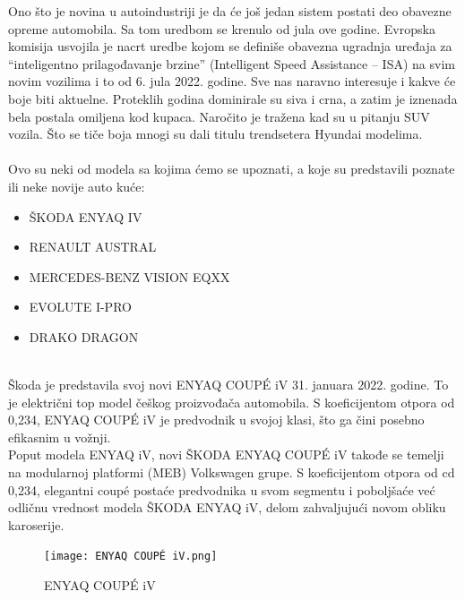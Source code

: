 \documentclass[a4paper]{article}
\begin{document}
    Ono što je novina u autoindustriji je da će još jedan sistem postati deo obavezne opreme automobila. Sa tom uredbom se krenulo od jula ove godine. Evropska komisija usvojila je nacrt uredbe kojom se definiše obavezna ugradnja uređaja za “inteligentno prilagođavanje brzine” (Intelligent Speed Assistance – ISA) na svim novim vozilima i to od 6. jula 2022. godine. Sve nas naravno interesuje i kakve će boje biti aktuelne. Proteklih godina dominirale su siva i crna, a zatim je iznenada bela postala omiljena kod kupaca. Naročito je tražena kad su u pitanju SUV vozila. Što se tiče boja mnogi su dali titulu  trendsetera Hyundai modelima.
    \\\\
    Ovo su neki od modela sa kojima ćemo se upoznati, a koje su predstavili poznate ili neke novije auto kuće:\\
    \begin{itemize}
     \item ŠKODA ENYAQ IV 
     \item RENAULT AUSTRAL   
     \item MERCEDES-BENZ VISION EQXX 
     \item EVOLUTE I-PRO 
     \item DRAKO DRAGON\\ 
    \end{itemize}
    
\\

    Škoda je predstavila svoj novi ENYAQ COUPÉ iV 31. januara 2022. godine. To je električni top model češkog proizvođača automobila. S koeficijentom otpora od 0,234, ENYAQ COUPÉ iV je predvodnik u svojoj klasi, što ga čini posebno efikasnim u vožnji. \\
    Poput modela ENYAQ iV, novi ŠKODA ENYAQ COUPÉ iV takođe se temelji na modularnoj platformi (MEB) Volkswagen grupe. S koeficijentom otpora od cd 0,234, elegantni coupé postaće predvodnika u svom segmentu i poboljšaće već odličnu vrednost modela ŠKODA ENYAQ iV, delom zahvaljujući novom obliku karoserije.\\ 

\begin{figure}[h]
        \centering
        \texttt{[image: ENYAQ COUPÉ iV.png]}
        \caption{ENYAQ COUPÉ iV}
        \label{fig:my_label1}
        \end{figure}
\end{document}
